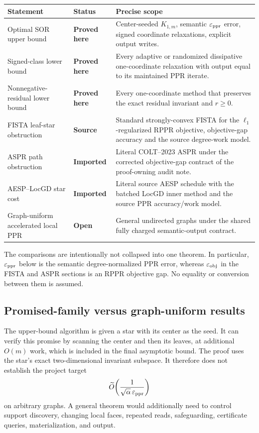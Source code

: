 \begin{center}
\begin{tabular}{p{}p{}p{}}
\toprule
Statement & Status & Precise scope \\
\midrule
Optimal SOR upper bound & \textbf{Proved here} & Center-seeded
$K_{1,m}$, semantic $\varepsilon_{\rm ppr}$ error, signed coordinate
relaxations, explicit output writes. \\
Signed-class lower bound & \textbf{Proved here} & Every adaptive or randomized
dissipative one-coordinate relaxation with output equal to its maintained PPR
iterate. \\
Nonnegative-residual lower bound & \textbf{Proved here} & Every one-coordinate
method that preserves the exact residual invariant and $r\ge0$. \\
FISTA leaf-star obstruction & \textbf{Source} & Standard strongly-convex
FISTA for the $\ell_1$-regularized RPPR objective, objective-gap accuracy and
the source degree-work model. \\
ASPR path obstruction & \textbf{Imported} & Literal COLT--2023 ASPR under the
corrected objective-gap contract of the proof-owning audit note. \\
AESP--LocGD star cost & \textbf{Imported} & Literal source AESP schedule with
the batched LocGD inner method and the source PPR accuracy/work model. \\
Graph-uniform accelerated local PPR & \textbf{Open} & General undirected
graphs under the shared fully charged semantic-output contract. \\
\bottomrule
\end{tabular}
\end{center}

The comparisons are intentionally not collapsed into one theorem.  In
particular,
\(\varepsilon_{\rm ppr}\) below is the semantic degree-normalized PPR error,
whereas \(\varepsilon_{\rm obj}\) in the FISTA and ASPR sections is an RPPR
objective gap.  No equality or conversion between them is assumed.

\subsection{Promised-family versus graph-uniform results}

The upper-bound algorithm is given a star with its center as the seed.  It can
verify this promise by scanning the center and then its leaves, at additional
$O(m)$ work, which is included in the final asymptotic bound.  The proof uses
the star's exact two-dimensional invariant subspace.  It therefore does not
establish the project target
\[
  \widetilde O\!\left(
      \frac{1}{\sqrt\alpha\,\varepsilon_{\rm ppr}}
  \right)
\]
on arbitrary graphs.  A general theorem would additionally need to control
support discovery, changing local faces, repeated reads, safeguarding,
certificate queries, materialization, and output.

